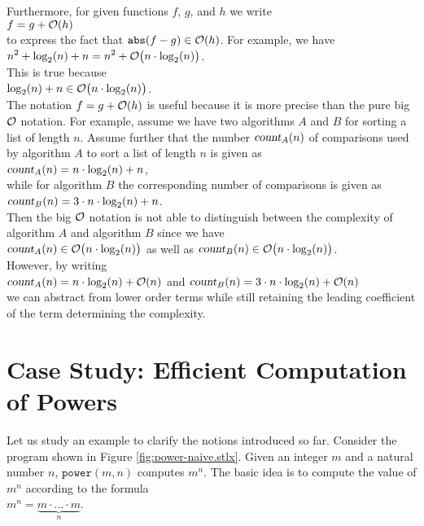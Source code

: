 Furthermore, for given functions $f$, $g$, and $h$ we write
\\[0.2cm]
\hspace*{1.3cm}
$f = g + \mathcal{O}(h)$
\\[0.2cm]
to express the fact that  $\mathtt{abs}(f - g) \in \mathcal{O}(h)$.  For example, we have 
\\[0.2cm]
\hspace*{1.3cm}
$\displaystyle n^2 + \log_2(n) + n = n^2 + \mathcal{O}\bigl(n \cdot \log_2(n)\bigr)$.
\\[0.2cm]
This is true because
\\[0.2cm]
\hspace*{1.3cm}
$\displaystyle \log_2(n) + n \in \mathcal{O}\bigl(n \cdot \log_2(n)\bigr)$.
\\[0.2cm] 
The notation $f = g + \mathcal{O}(h)$ is useful because it is more precise than the pure big $\mathcal{O}$
notation.  For example, assume we have two algorithms $A$ and $B$ for sorting a list of length
$n$.  Assume further that the number $\textsl{count}_A(n)$ of comparisons used by algorithm $A$ to sort a list of
length $n$ is given as
\\[0.2cm]
\hspace*{1.3cm}
$\displaystyle\textsl{count}_A(n) = n \cdot \log_2(n) + n$,
\\[0.2cm]
while for algorithm $B$ the corresponding number of comparisons is given as
\\[0.2cm]
\hspace*{1.3cm}
$\displaystyle\textsl{count}_B(n) = 3 \cdot n \cdot \log_2(n) + n$.
\\[0.2cm]
Then the big $\mathcal{O}$ notation is not able to distinguish between the complexity of algorithm $A$ and
algorithm $B$ since we have
\\[0.2cm]
\hspace*{1.3cm}
$\textsl{count}_A(n) \in \mathcal{O}\bigl(n \cdot \log_2(n)\bigr)$ \quad as well as \quad
$\textsl{count}_B(n) \in \mathcal{O}\bigl(n \cdot \log_2(n)\bigr)$.
\\[0.2cm]
However, by writing
\\[0.2cm]
\hspace*{1.3cm}
$\displaystyle\textsl{count}_A(n) = n \cdot \log_2(n) + \mathcal{O}(n)$ \quad and \quad
$\displaystyle\textsl{count}_B(n) = 3 \cdot n \cdot \log_2(n) + \mathcal{O}(n)$
\\[0.2cm]
we can abstract from lower order terms while still retaining the leading coefficient of the term
determining the complexity.  
\pagebreak

\section[Computation of Powers]{Case Study:  Efficient Computation of Powers}
Let us study an example to clarify the notions introduced so far.  
Consider the program shown in Figure \ref{fig:power-naive.stlx}.  Given an integer $m$ and a
natural number $n$, $\mathtt{power}(m, n)$ computes $m^n$.
The basic idea is to compute the value of $m^n$ according to the formula \\[0.2cm]
\hspace*{1.3cm} 
$m^n = \underbrace{m \cdot {\dots} \cdot m}_n$. 


